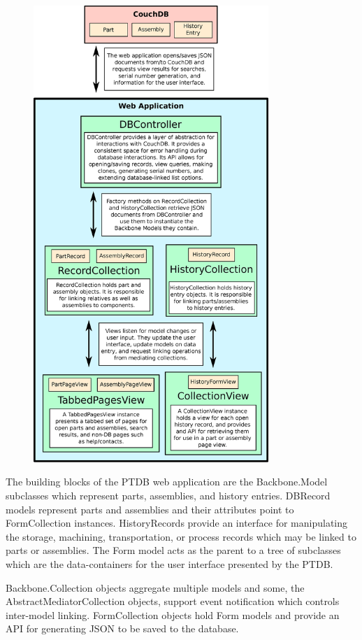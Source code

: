 \documentclass[journal]{IEEEtran}
\begin{document}
\begin{figure}[!t]
\centering
\includegraphics[width=3.5in]{simple_structure}
\caption{}
\label{simple_structure}
\end{figure}

The building blocks of the PTDB web application are the Backbone.Model subclasses which represent parts, 
assemblies, and history entries. DBRecord models represent parts
and assemblies and their attributes point to FormCollection instances. HistoryRecords provide an interface for manipulating 
the storage, machining, transportation, or process records which may be linked to parts or assemblies. The Form model
acts as the parent to a tree of subclasses which are the data-containers for the user interface presented by the PTDB.

Backbone.Collection objects aggregate multiple models and some, the AbstractMediatorCollection objects, support event notification
which controls inter-model linking. FormCollection objects hold Form models and provide an API for generating JSON to be
saved to the database.
\end{document}
